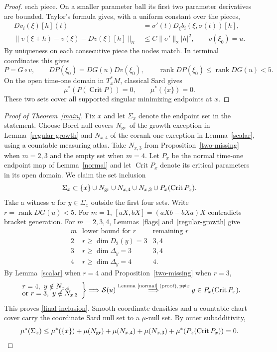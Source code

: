 \documentclass[11pt,letterpaper]{article}
\newcommand{\rank}{\operatorname{rank}}
\begin{document}
\begin{proof}
each piece. On a smaller parameter ball its first two parameter derivatives
are bounded. Taylor's formula gives, with a uniform constant over the pieces,
\[
 \begin{aligned}
 Dv_i(\xi)[h](t)&=\sigma'(t)D_\xi b_i(\xi,\sigma(t))[h],\\
 \|v(\xi+h)-v(\xi)-Dv(\xi)[h]\|_{\mathcal U}
       &\le C\|\sigma'\|_2 |h|^2,\qquad v(\xi_0)=u .
 \end{aligned}
\]
By uniqueness on each consecutive piece the nodes match. In terminal
coordinates this gives
\[
 P=G\circ v,\qquad DP(\xi_0)=DG(u)Dv(\xi_0),\qquad
 \rank DP(\xi_0)\le\rank DG(u)<5 .
\]
On the open time-one domain in $T_x^*M$, classical Sard gives
\[
 \mu^*(P(\operatorname{Crit}P))=0,\qquad \mu^*(\{x\})=0 .
\]
These two sets cover all supported singular minimizing endpoints at $x$.
\end{proof}

\begin{proof}[Proof of Theorem~\ref{main}]
Fix $x$ and let $\Sigma_x$ denote the endpoint set in the statement.
Choose Borel null covers $N_{\rm gr}$ of the growth exception in
Lemma~\ref{regular-growth} and $N_{x,4}$ of the corank-one exception
in Lemma~\ref{scalar}, using a countable measuring atlas. Take
$N_{x,3}$ from Proposition~\ref{two-missing} when $m=2,3$ and the
empty set when $m=4$. Let $P_x$ be the normal time-one endpoint map
of Lemma~\ref{normal} and let $\operatorname{Crit}P_x$ denote its critical
parameters in its open domain. We claim the set inclusion
\begin{equation}\label{final-inclusion}
 \Sigma_x\subset \{x\}\cup N_{\rm gr}\cup N_{x,4}\cup N_{x,3}
                  \cup P_x(\operatorname{Crit}P_x).
\end{equation}
Take a witness $u$ for $y\in\Sigma_x$ outside the first four sets.
Write $r=\rank DG(u)<5$. For $m=1$, $[aX,bX]=(aXb-bXa)X$ contradicts
bracket generation. For $m=2,3,4$, Lemmas~\ref{flags} and~\ref{regular-growth} give
\[
 \begin{array}{c|c|c}
 m & \text{lower bound for }r &\text{remaining }r\\ \hline
 2 & r\ge\dim D_2(y)=3 &3,4\\
 3 & r\ge\dim\Delta_y=3&3,4\\
 4 & r\ge\dim\Delta_y=4&4 .
 \end{array}
\]
By Lemma~\ref{scalar} when $r=4$ and Proposition~\ref{two-missing} when $r=3$,
\[
 \left.
 \begin{array}{l}
 r=4,\ y\notin N_{x,4}\\[-2pt]
 \text{or }r=3,\ y\notin N_{x,3}
 \end{array}\right\}
 \Longrightarrow\mathcal S(u)
 \overset{\text{Lemma~\ref{normal} (proof)},\,y\ne x}{\Longrightarrow}
 y\in P_x(\operatorname{Crit}P_x).
\]
This proves \eqref{final-inclusion}. Smooth coordinate densities and a
countable chart cover carry the coordinate Sard null set to a $\mu$-null set.
By outer subadditivity,
\[
 \mu^*(\Sigma_x)\le\mu^*(\{x\})+\mu(N_{\rm gr})+\mu(N_{x,4})
          +\mu(N_{x,3})+\mu^*(P_x(\operatorname{Crit}P_x))=0 .
\]
\end{proof}
\end{document}

